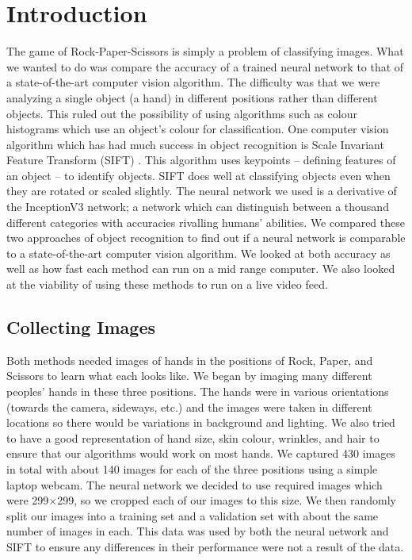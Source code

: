 \section{Introduction}
\label{introduction}

The game of Rock-Paper-Scissors is simply a problem of classifying images. What we wanted to do was compare the accuracy of a trained neural network to that of a state-of-the-art computer vision algorithm. The difficulty was that we were analyzing a single object (a hand) in different positions rather than different objects. This ruled out the possibility of using algorithms such as colour histograms which use an object's colour for classification. One computer vision algorithm which has had much success in object recognition is Scale Invariant Feature Transform (SIFT) \cite{SIFT}. This algorithm uses keypoints -- defining features of an object -- to identify objects. SIFT does well at classifying objects even when they are rotated or scaled slightly. The neural network we used is a derivative of the InceptionV3 network; a network which can distinguish between a thousand different categories with accuracies rivalling humans' abilities. We compared these two approaches of object recognition to find out if a neural network is comparable to a state-of-the-art computer vision algorithm. We looked at both accuracy as well as how fast each method can run on a mid range computer. We also looked at the viability of using these methods to run on a live video feed.

\subsection{Collecting Images}
Both methods needed images of hands in the positions of Rock, Paper, and Scissors to learn what each looks like. We began by imaging many different peoples' hands in these three positions. The hands were in various orientations (towards the camera, sideways, etc.) and the images were taken in different locations so there would be variations in background and lighting.  We also tried to have a good representation of hand size, skin colour, wrinkles, and hair to ensure that our algorithms would work on most hands. We captured 430 images in total with about 140 images for each of the three positions using a simple laptop webcam. The neural network we decided to use required images which were 299$\times$299, so we cropped each of our images to this size. We then randomly split our images into a training set and a validation set with about the same number of images in each. This data was used by both the neural network and SIFT to ensure any differences in their performance were not a result of the data.

